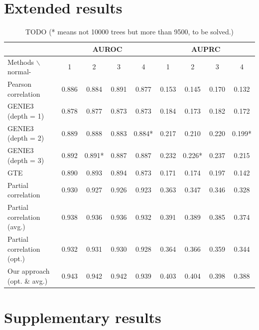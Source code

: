 \documentclass[wcp]{jmlr}
\begin{document}
\section{Extended results}

\begin{table}
\small
\centering
\begin{tabular}{@{}l *{8}{c}@{}}
  & \multicolumn{4}{c}{AUROC} & \multicolumn{4}{c}{AUPRC} \\
\hline \hline
Methods $\backslash$ normal- & 1 & 2 & 3 & 4 & 1 & 2 & 3 & 4 \\
\hline \hline
Pearson correlation    & 0.886 & 0.884 & 0.891 & 0.877 & 0.153 & 0.145 & 0.170 & 0.132 \\
GENIE3 (depth = 1)     & 0.878 & 0.877 & 0.873 & 0.873 & 0.184 & 0.173 & 0.182& 0.172\\
GENIE3 (depth = 2)     & 0.889 & 0.888 & 0.883 & 0.884* & 0.217 & 0.210 & 0.220 & 0.199* \\
GENIE3 (depth = 3)     & 0.892 & 0.891* & 0.887 & 0.887 & 0.232 & 0.226* & 0.237 & 0.215\\
GTE                    & 0.890 & 0.893 & 0.894 & 0.873 & 0.171 & 0.174 & 0.197 & 0.142 \\
Partial correlation    & 0.930 &  0.927 &  0.926 &  0.923& 0.363  & 0.347 &  0.346 & 0.328 \\
Partial correlation (avg.) & 0.938 & 0.936 & 0.936 & 0.932& 0.391 & 0.389 & 0.385 & 0.374\\
Partial correlation (opt.) & 0.932 & 0.931 & 0.930 & 0.928 & 0.364 & 0.366 & 0.359 & 0.344 \\
Our approach (opt. \& avg.)    & 0.943 & 0.942 & 0.942 & 0.939 & 0.403 & 0.404 & 0.398 & 0.388 \\
\end{tabular}
\caption{TODO (* means not 10000 trees but more than 9500, to be solved.) }
\label{tab:tab1}
\end{table}


\section{Supplementary results}
\end{document}
